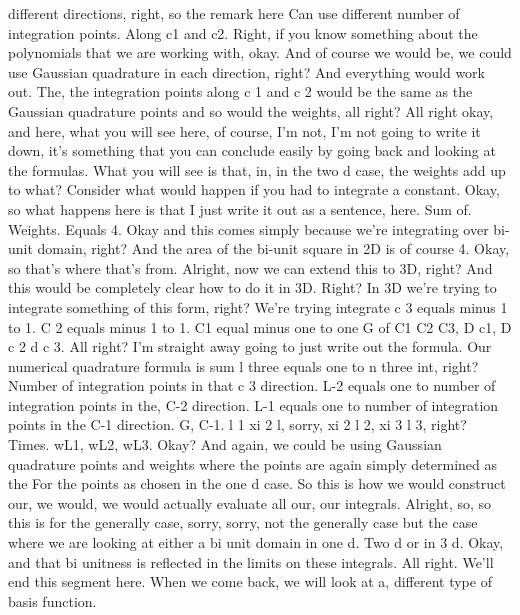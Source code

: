 \documentclass[10pt]{article}
\begin{document}
different directions, right, so the remark here Can use different number of integration points. Along c1 and c2. Right, if you know something about the polynomials that we are working with, okay. And of course we would be, we could use Gaussian quadrature in each direction, right? And everything would work out. The, the integration points along c 1 and c 2 would be the same as the Gaussian quadrature points and so would the weights, all right? All right okay, and here, what you will see here, of course, I'm not, I'm not going to write it down, it's something that you can conclude easily by going back and looking at the formulas. What you will see is that, in, in the two d case, the weights add up to what? Consider what would happen if you had to integrate a constant. Okay, so what happens here is that I just write it out as a sentence, here. Sum of. Weights. Equals 4. Okay and this comes simply because we're integrating over bi-unit domain, right? And the area of the bi-unit square in 2D is of course 4. Okay, so that's where that's from. Alright, now we can extend this to 3D, right? And this would be completely clear how to do it in 3D. Right? In 3D we're trying to integrate something of this form, right? We're trying integrate c 3 equals minus 1 to 1. C 2 equals minus 1 to 1. C1 equal minus one to one G of C1 C2 C3, D c1, D c 2 d c 3. All right? I'm straight away going to just write out the formula. Our numerical quadrature formula is sum l three equals one to n three int, right? Number of integration points in that c 3 direction. L-2 equals one to number of integration points in the, C-2 direction. L-1 equals one to number of integration points in the C-1 direction. G, C-1. l 1 xi 2 l, sorry, xi 2 l 2, xi 3 l 3, right? Times. wL1, wL2, wL3. Okay? And again, we could be using Gaussian quadrature points and weights where the points are again simply determined as the For the points as chosen in the one d case. So this is how we would construct our, we would, we would actually evaluate all our, our integrals. Alright, so, so this is for the generally case, sorry, sorry, not the generally case but the case where we are looking at either a bi unit domain in one d. Two d or in 3 d. Okay, and that bi unitness is reflected in the limits on these integrals. All right. We'll end this segment here. When we come back, we will look at a, different type of basis function.
\end{document}
